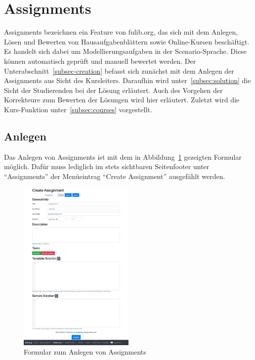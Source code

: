 \section{Assignments}\label{sec:assignments}

Assignments bezeichnen ein Feature von fulib.org, das sich mit dem Anlegen, Lösen und Bewerten von Hausaufgabenblättern sowie Online-Kursen beschäftigt.
Es handelt sich dabei um Modellierungsaufgaben in der Scenario-Sprache.
Diese können automatisch geprüft und manuell bewertet werden.
Der Unterabschnitt~\ref{subsec-creation} befasst sich zunächst mit dem Anlegen der Assignments aus Sicht des Kursleiters.
Daraufhin wird unter~\ref{subsec:solution} die Sicht der Studierenden bei der Lösung erläutert.
Auch des Vorgehen der Korrekteure zum Bewerten der Lösungen wird hier erläutert.
Zuletzt wird die Kurs-Funktion unter~\ref{subsec:courses} vorgestellt.

\subsection{Anlegen}\label{subsec:creation}

Das Anlegen von Assignments ist mit dem in Abbildung~\ref{fig:create-assignment} gezeigten Formular möglich.
Dafür muss lediglich im stets sichtbaren Seitenfooter unter ``Assignments'' der Menüeintrag ``Create Assignment'' ausgefählt werden.

\begin{figure}
    \centering
    \includegraphics[width=0.5\textwidth]{chapter/fulib.org/img/create-assignment.png}
    \caption{Formular zum Anlegen von Assignments}
    \label{fig:create-assignment}
\end{figure}


